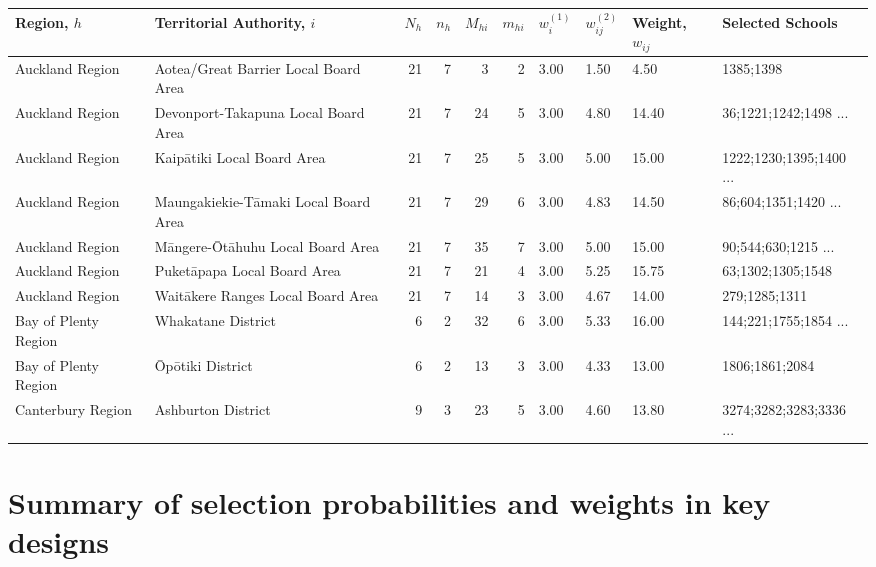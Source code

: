 \documentclass[
]{book}
\begin{document}
\begin{table}
\centering
\begin{tabular}[t]{l|l|r|r|r|r|l|l|l|l}
\hline
Region, $h$ & Territorial Authority, $i$ & $N_h$ & $n_h$ & $M_{hi}$ & $m_{hi}$ & $w^{(1)}_i$ & $w^{(2)}_{ij}$ & Weight, $w_{ij}$ & Selected Schools\\
\hline
Auckland Region & Aotea/Great Barrier Local Board Area & 21 & 7 & 3 & 2 & 3.00 & 1.50 & 4.50 & 1385;1398\\
\hline
Auckland Region & Devonport-Takapuna Local Board Area & 21 & 7 & 24 & 5 & 3.00 & 4.80 & 14.40 & 36;1221;1242;1498 ...\\
\hline
Auckland Region & Kaipātiki Local Board Area & 21 & 7 & 25 & 5 & 3.00 & 5.00 & 15.00 & 1222;1230;1395;1400 ...\\
\hline
Auckland Region & Maungakiekie-Tāmaki Local Board Area & 21 & 7 & 29 & 6 & 3.00 & 4.83 & 14.50 & 86;604;1351;1420 ...\\
\hline
Auckland Region & Māngere-Ōtāhuhu Local Board Area & 21 & 7 & 35 & 7 & 3.00 & 5.00 & 15.00 & 90;544;630;1215 ...\\
\hline
Auckland Region & Puketāpapa Local Board Area & 21 & 7 & 21 & 4 & 3.00 & 5.25 & 15.75 & 63;1302;1305;1548\\
\hline
Auckland Region & Waitākere Ranges Local Board Area & 21 & 7 & 14 & 3 & 3.00 & 4.67 & 14.00 & 279;1285;1311\\
\hline
Bay of Plenty Region & Whakatane District & 6 & 2 & 32 & 6 & 3.00 & 5.33 & 16.00 & 144;221;1755;1854 ...\\
\hline
Bay of Plenty Region & Ōpōtiki District & 6 & 2 & 13 & 3 & 3.00 & 4.33 & 13.00 & 1806;1861;2084\\
\hline
Canterbury Region & Ashburton District & 9 & 3 & 23 & 5 & 3.00 & 4.60 & 13.80 & 3274;3282;3283;3336 ...\\
\hline
\end{tabular}
\end{table}

\section{Summary of selection probabilities and weights in key designs}\label{summary-of-selection-probabilities-and-weights-in-key-designs}
\end{document}
